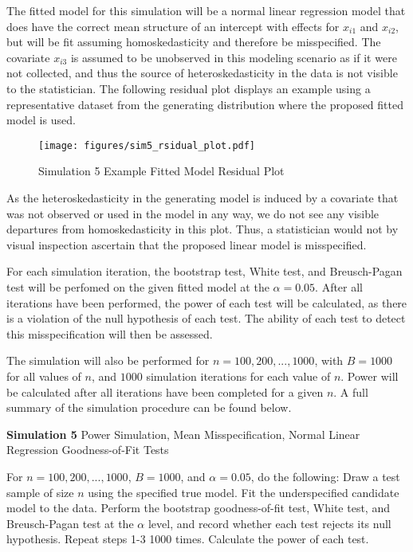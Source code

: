 		The fitted model for this simulation will be a normal linear regression model that does have the correct mean structure of an intercept with effects for $x_{i1}$ and $x_{i2}$, but will
		be fit assuming homoskedasticity and therefore be misspecified. The covariate $x_{i3}$ is assumed to be unobserved in this modeling scenario as if it were not collected, and thus the
		source of heteroskedasticity in the data is not visible to the statistician. The following residual plot displays an example using a representative dataset from the generating distribution
		where the proposed fitted model is used.

		\begin{figure}[H]
			\centering
			\captionsetup{justification=centering}
			\texttt{[image: figures/sim5\_rsidual\_plot.pdf]}
			\caption{\label{fig:sim5_residual_plot} Simulation 5 Example Fitted Model Residual Plot}
		\end{figure}

		As the heteroskedasticity in the generating model is induced by a covariate that was not observed or used in the model in any way, we do not see any visible departures from
		homoskedasticity in this plot. Thus, a statistician would not by visual inspection ascertain that the proposed linear model is misspecified. 

		For each simulation iteration, the bootstrap test, White test, and Breusch-Pagan test will be perfomed on the given fitted model at the $\alpha = 0.05$. After all iterations have been
		performed, the power of each test will be calculated, as there is a violation of the null hypothesis of each test. The ability of each test to detect this misspecification will
		then be assessed.

		The simulation will also be performed for $n = 100,200,...,1000$, with $B = 1000$ for all values of $n$, and $1000$ simulation iterations for each value of $n$. 
		Power will be calculated after all iterations have been completed for a given $n$. A full summary of the simulation procedure can be found below.
		\begin{algorithm}[H]
			\caption*{\textbf{Simulation 5} Power Simulation, Mean Misspecification, Normal Linear Regression Goodness-of-Fit Tests}
			\begin{algorithmic}[1]
			  \Statex For $n = 100,200,...,1000$, $B = 1000$, and $\alpha = 0.05$, do the following:
			  \State Draw a test sample of size $n$ using the specified true model.
			  \State Fit the underspecified candidate model to the data.
			  \State Perform the bootstrap goodness-of-fit test, White test, and Breusch-Pagan test at the $\alpha$ level,
			  and record whether each test rejects its null hypothesis.
			  \State Repeat steps 1-3 1000 times.
			  \State Calculate the power of each test.
			\end{algorithmic}
		\end{algorithm}

